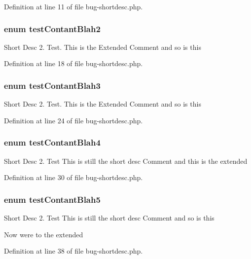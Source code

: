 \-Definition at line 11 of file bug-\/shortdesc.\-php.

\hypertarget{bug-shortdesc_8php_a7005da070457bc2f25107e37ef2bfe20}{
\subsubsection[{test\-Contant\-Blah2}]{\setlength{\rightskip}{0pt plus 5cm}enum {\bf test\-Contant\-Blah2}}}\label{bug-shortdesc_8php_a7005da070457bc2f25107e37ef2bfe20}
\-Short \-Desc 2. \-Test. \-This is the \-Extended \-Comment and so is this 

\-Definition at line 18 of file bug-\/shortdesc.\-php.

\hypertarget{bug-shortdesc_8php_a72cc93c42d31c42837326815765e0b34}{
\subsubsection[{test\-Contant\-Blah3}]{\setlength{\rightskip}{0pt plus 5cm}enum {\bf test\-Contant\-Blah3}}}\label{bug-shortdesc_8php_a72cc93c42d31c42837326815765e0b34}
\-Short \-Desc 2. \-Test. \-This is the \-Extended \-Comment and so is this 

\-Definition at line 24 of file bug-\/shortdesc.\-php.

\hypertarget{bug-shortdesc_8php_a8124928b8a202b0433a73ceae343a7ba}{
\subsubsection[{test\-Contant\-Blah4}]{\setlength{\rightskip}{0pt plus 5cm}enum {\bf test\-Contant\-Blah4}}}\label{bug-shortdesc_8php_a8124928b8a202b0433a73ceae343a7ba}
\-Short \-Desc 2. \-Test \-This is still the short desc \-Comment and this is the extended 

\-Definition at line 30 of file bug-\/shortdesc.\-php.

\hypertarget{bug-shortdesc_8php_a28fa4747f7cc27baf3749252fb8d5aa6}{
\subsubsection[{test\-Contant\-Blah5}]{\setlength{\rightskip}{0pt plus 5cm}enum {\bf test\-Contant\-Blah5}}}\label{bug-shortdesc_8php_a28fa4747f7cc27baf3749252fb8d5aa6}
\-Short \-Desc 2. \-Test \-This is still the short desc \-Comment and so is this

\-Now were to the extended 

\-Definition at line 38 of file bug-\/shortdesc.\-php.

